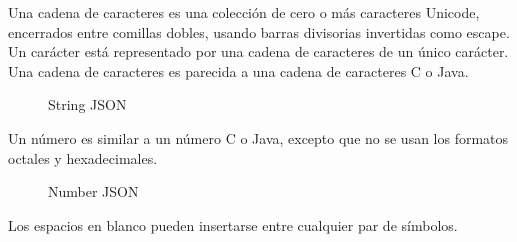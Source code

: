 Una cadena de caracteres es una colecci\'on de cero o m\'as caracteres Unicode, encerrados entre comillas dobles, usando barras divisorias invertidas como escape. Un car\'acter est\'a representado por una cadena de caracteres de un \'unico car\'acter. Una cadena de caracteres es parecida a una cadena de caracteres C o Java.

\begin{figure}[H]
\centering
{}
\caption{String JSON} \label{fig:stringJSON}
\end{figure}

Un n\'umero es similar a un n\'umero C o Java, excepto que no se usan los formatos octales y hexadecimales.

\begin{figure}[H]
\centering
{}
\caption{Number JSON} \label{fig:numberJSON}
\end{figure}

Los espacios en blanco pueden insertarse entre cualquier par de s\'imbolos.

